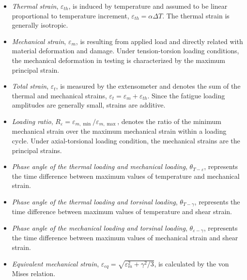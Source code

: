 \documentclass[preprint,5p,twocolumn,11pt,sort&compress]{elsarticle}
\begin{document}
\begin{itemize}
  \item {\em Thermal strain}, $\varepsilon_{th}$, is induced by temperature and assumed to be linear proportional to temperature increment, $\varepsilon_{th}=\alpha \Delta T$. The thermal strain is generally isotropic.
  \item {\em Mechanical strain}, $\varepsilon_{m}$, is resulting from applied load and directly related with material deformation and damage. Under tension-torsion loading conditions, the mechanical deformation in testing is characterized by the maximum principal strain.
  \item {\em Total strain}, $\varepsilon_t$, is measured by the extensometer and denotes the sum of the thermal and mechanical strains, $\varepsilon_t=\varepsilon_m+\varepsilon_{th}$. Since the fatigue loading amplitudes are generally small, strains are additive.
  \item {\em Loading ratio}, $R_{\varepsilon}=\varepsilon_{m,\min}/\varepsilon_{m,\max}$, denotes the ratio of the minimum mechanical strain over the maximum mechanical strain within a loading cycle. Under axial-torsional loading condition, the mechanical strains are the principal strains.
  \item {\em Phase angle of the thermal loading and mechanical loading}, $\theta_{T-\varepsilon}$, represents the time difference between maximum values of temperature and mechanical strain. %
  \item {\em Phase angle of the thermal loading and torsinal loading}, $\theta_{T-\gamma}$, represents the time difference between maximum values of temperature and shear strain.
  \item {\em Phase angle of the mechanical loading and torsinal loading}, $\theta_{\varepsilon-\gamma}$, represents the time difference between maximum values of mechanical strain and shear strain.
  \item {\em Equivalent mechanical strain}, $\varepsilon_{eq}=\sqrt {\varepsilon _m^2 + {\gamma ^2}/3}$, is calculated by the von Mises relation\cite{Pol1991Cyclic}.
\end{itemize}
\end{document}
